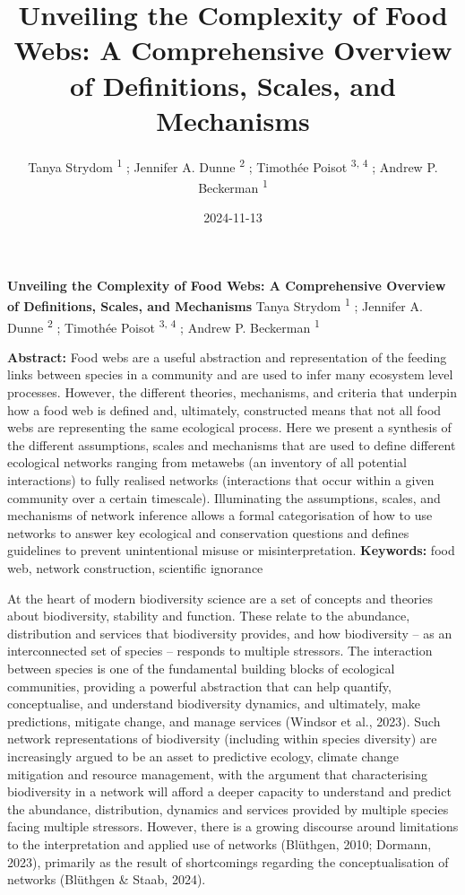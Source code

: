 \documentclass[
]{article}
\title{Unveiling the Complexity of Food Webs: A Comprehensive Overview
of Definitions, Scales, and Mechanisms}
\author{Tanya Strydom %
%
\textsuperscript{%
%
1%
}%
; Jennifer A. Dunne %
%
\textsuperscript{%
%
2%
}%
; Timothée Poisot %
%
\textsuperscript{%
3,%
4%
}%
; Andrew P. Beckerman %
%
\textsuperscript{%
%
1%
}%
}
\date{2024-11-13}
\begin{document}
\thispagestyle{empty}
{\bfseries\sffamily\Large Unveiling the Complexity of Food Webs: A
Comprehensive Overview of Definitions, Scales, and Mechanisms}
\vfil
Tanya Strydom %
%
\textsuperscript{%
%
1%
}%
; Jennifer A. Dunne %
%
\textsuperscript{%
%
2%
}%
; Timothée Poisot %
%
\textsuperscript{%
3,%
4%
}%
; Andrew P. Beckerman %
%
\textsuperscript{%
%
1%
}%

\vfil
{\small
\textbf{Abstract:} Food webs are a useful abstraction and representation
of the feeding links between species in a community and are used to
infer many ecosystem level processes. However, the different theories,
mechanisms, and criteria that underpin how a food web is defined and,
ultimately, constructed means that not all food webs are representing
the same ecological process. Here we present a synthesis of the
different assumptions, scales and mechanisms that are used to define
different ecological networks ranging from metawebs (an inventory of all
potential interactions) to fully realised networks (interactions that
occur within a given community over a certain timescale). Illuminating
the assumptions, scales, and mechanisms of network inference allows a
formal categorisation of how to use networks to answer key ecological
and conservation questions and defines guidelines to prevent
unintentional misuse or misinterpretation.
\vfil
\textbf{Keywords:} %
food web, network construction, %
scientific ignorance%
}
\clearpage
\setcounter{page}{1}
\doublespacing
\linenumbers


At the heart of modern biodiversity science are a set of concepts and
theories about biodiversity, stability and function. These relate to the
abundance, distribution and services that biodiversity provides, and how
biodiversity -- as an interconnected set of species -- responds to
multiple stressors. The interaction between species is one of the
fundamental building blocks of ecological communities, providing a
powerful abstraction that can help quantify, conceptualise, and
understand biodiversity dynamics, and ultimately, make predictions,
mitigate change, and manage services (Windsor et al., 2023). Such
network representations of biodiversity (including within species
diversity) are increasingly argued to be an asset to predictive ecology,
climate change mitigation and resource management, with the argument
that characterising biodiversity in a network will afford a deeper
capacity to understand and predict the abundance, distribution, dynamics
and services provided by multiple species facing multiple stressors.
However, there is a growing discourse around limitations to the
interpretation and applied use of networks (Blüthgen, 2010; Dormann,
2023), primarily as the result of shortcomings regarding the
conceptualisation of networks (Blüthgen \& Staab, 2024).
\end{document}
